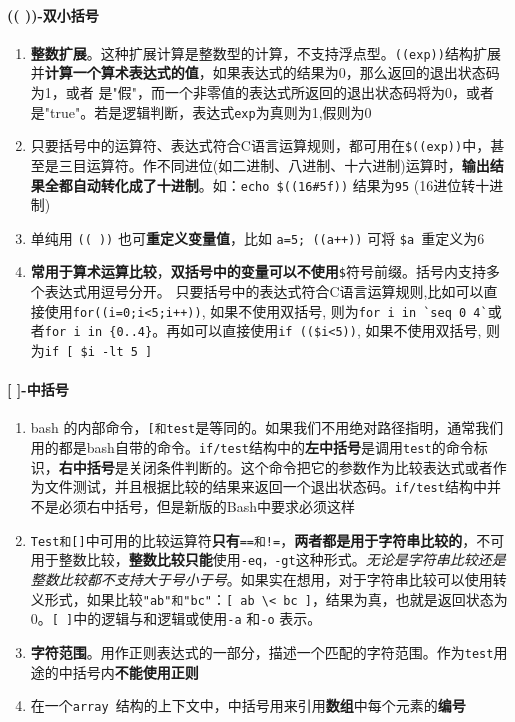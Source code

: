 \documentclass[UTF8,a4paper,12pt]{ctexbook}
\begin{document}
			\paragraph{(( ))-双小括号}
				\begin{enumerate}
					\item \textbf{整数扩展}。这种扩展计算是整数型的计算，不支持浮点型。\verb|((exp))|结构扩展并\textbf{计算一个算术表达式的值}，如果表达式的结果为0，那么返回的退出状态码为1，或者 是"假"，而一个非零值的表达式所返回的退出状态码将为0，或者是"true"。若是逻辑判断，表达式\verb|exp|为真则为1,假则为0
					
					\item 只要括号中的运算符、表达式符合C语言运算规则，都可用在\verb|$((exp))|中，甚至是三目运算符。作不同进位(如二进制、八进制、十六进制)运算时，\textbf{输出结果全都自动转化成了十进制}。如：\verb|echo $((16#5f))| 结果为\verb|95| (16进位转十进制)
					
					\item 单纯用 \verb|(( ))| 也可\textbf{重定义变量值}，比如 \verb|a=5; ((a++))| 可将 \verb|$a |重定义为6
					
					\item \textbf{常用于算术运算比较}，\textbf{双括号中的变量可以不使用}\verb|$|符号前缀。括号内支持多个表达式用逗号分开。 只要括号中的表达式符合C语言运算规则,比如可以直接使用\verb|for((i=0;i<5;i++))|, 如果不使用双括号, 则为\verb|for i in `seq 0 4`|或者\verb|for i in {0..4}|。再如可以直接使用\verb|if (($i<5))|, 如果不使用双括号, 则为\verb|if [ $i -lt 5 ]|
				\end{enumerate}
				
			\paragraph{[ ]-中括号}
				\begin{enumerate}
					\item bash 的内部命令，\verb|[和test|是等同的。如果我们不用绝对路径指明，通常我们用的都是bash自带的命令。\verb|if/test|结构中的\textbf{左中括号}是调用\verb|test|的命令标识，\textbf{右中括号}是关闭条件判断的。这个命令把它的参数作为比较表达式或者作为文件测试，并且根据比较的结果来返回一个退出状态码。\verb|if/test|结构中并不是必须右中括号，但是新版的Bash中要求必须这样
					
					\item \verb|Test和[]|中可用的比较运算符\textbf{只有}\verb|==和!=|，\textbf{两者都是用于字符串比较的}，不可用于整数比较，\textbf{整数比较只能}使用\verb|-eq，-gt|这种形式。\textit{无论是字符串比较还是整数比较都不支持大于号小于号}。如果实在想用，对于字符串比较可以使用转义形式，如果比较\verb|"ab"和"bc"|：\verb|[ ab \< bc ]|，结果为真，也就是返回状态为0。\verb|[ ]|中的逻辑与和逻辑或使用\verb|-a| 和\verb|-o| 表示。
					
					\item \textbf{字符范围}。用作正则表达式的一部分，描述一个匹配的字符范围。作为\verb|test|用途的中括号内\textbf{不能使用正则}
					
					\item 在一个\verb|array |结构的上下文中，中括号用来引用\textbf{数组}中每个元素的\textbf{编号}
				\end{enumerate}
				
\end{document}
